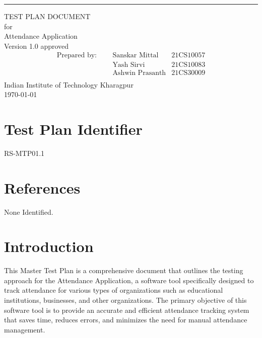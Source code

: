 \documentclass{scrreprt}
\date{}
\def\myversion{1.0 }
\begin{document}
\begin{flushright}
    \rule{16cm}{5pt}\vskip1cm
    \begin{bfseries}
        \Huge{TEST PLAN DOCUMENT}\\
        \vspace{1cm}
        for\\
        \vspace{1cm}
        Attendance Application\\
        \vspace{1cm}
        \LARGE{Version \myversion approved}\\
        \vspace{0cm}
        \begin{align*}
        \text{Prepared by: } \;\;\;\; 
         &\text{Sanskar Mittal} &\text{21CS10057}\\
         &\text{Yash Sirvi} &\text{21CS10083}\\
         &\text{Ashwin Prasanth} &\text{21CS30009}\\
        \end{align*}
        \vspace{1.9cm}
        Indian Institute of Technology Kharagpur\\
        \vspace{1.9cm}
        \today\\
    \end{bfseries}
\end{flushright}

\tableofcontents

\pagebreak

\chapter{Test Plan Identifier}
RS-MTP01.1

\chapter{References}
None Identified.

\chapter{Introduction}
This Master Test Plan is a comprehensive document that outlines the testing approach for the Attendance Application, a software tool specifically designed to track attendance for various types of organizations such as educational institutions, businesses, and other organizations. The primary objective of this software tool is to provide an accurate and efficient attendance tracking system that saves time, reduces errors, and minimizes the need for manual attendance management.\\
\end{document}
